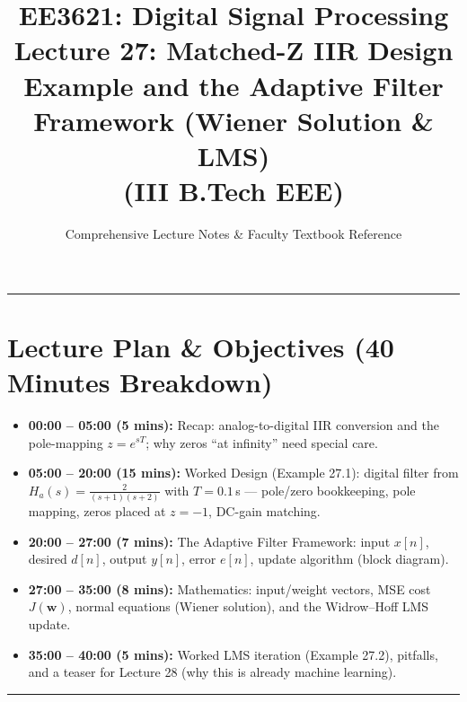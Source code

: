 \documentclass[11pt,a4paper]{article}
\title{\textbf{EE3621: Digital Signal Processing} \\ \Large Lecture 27: Matched-Z IIR Design Example and the Adaptive Filter Framework (Wiener Solution \& LMS) \\ \large (III B.Tech EEE)}
\author{Comprehensive Lecture Notes \& Faculty Textbook Reference}
\date{}
\begin{document}
\maketitle

\noindent\rule{\textwidth}{0.5pt}

\section*{Lecture Plan \& Objectives (40 Minutes Breakdown)}
\begin{itemize}
    \item \textbf{00:00 -- 05:00 (5 mins):} Recap: analog-to-digital IIR conversion and the pole-mapping $z = e^{sT}$; why zeros ``at infinity'' need special care.
    \item \textbf{05:00 -- 20:00 (15 mins):} Worked Design (Example 27.1): digital filter from $H_a(s) = \frac{2}{(s+1)(s+2)}$ with $T = 0.1$\,s --- pole/zero bookkeeping, pole mapping, zeros placed at $z=-1$, DC-gain matching.
    \item \textbf{20:00 -- 27:00 (7 mins):} The Adaptive Filter Framework: input $x[n]$, desired $d[n]$, output $y[n]$, error $e[n]$, update algorithm (block diagram).
    \item \textbf{27:00 -- 35:00 (8 mins):} Mathematics: input/weight vectors, MSE cost $J(\mathbf{w})$, normal equations (Wiener solution), and the Widrow--Hoff LMS update.
    \item \textbf{35:00 -- 40:00 (5 mins):} Worked LMS iteration (Example 27.2), pitfalls, and a teaser for Lecture 28 (why this is already machine learning).
\end{itemize}

\noindent\rule{\textwidth}{0.5pt}
\end{document}

